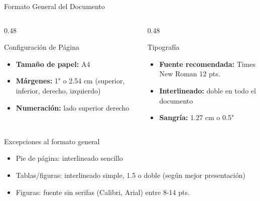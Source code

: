 \documentclass[spanish,aspectratio=169]{beamer}
\begin{document}
	\begin{frame}{Formato General del Documento}
		\begin{columns}[T]
			\begin{column}{0.48\textwidth}
				\begin{block}{Configuración de Página}
					\begin{itemize}
						\item \textbf{Tamaño de papel:} A4
						\item \textbf{Márgenes:} 1" o 2.54 cm (superior, inferior, derecho, izquierdo)
						\item \textbf{Numeración:} lado superior derecho
					\end{itemize}
				\end{block}
			\end{column}
			
			\begin{column}{0.48\textwidth}
				\begin{block}{Tipografía}
					\begin{itemize}
						\item \textbf{Fuente recomendada:} Times New Roman 12 pts.
						\item \textbf{Interlineado:} doble en todo el documento
						\item \textbf{Sangría:} 1.27 cm o 0.5"
					\end{itemize}
				\end{block}
			\end{column}
		\end{columns}
		
		\vspace{0.5cm}
		\begin{exampleblock}{Excepciones al formato general}
			\begin{itemize}
				\item Pie de página: interlineado sencillo
				\item Tablas/figuras: interlineado simple, 1.5 o doble (según mejor presentación)
				\item Figuras: fuente sin serifas (Calibri, Arial) entre 8-14 pts.
			\end{itemize}
		\end{exampleblock}
	\end{frame}
	
\end{document}
